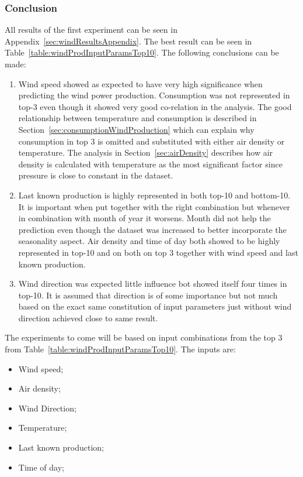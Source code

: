 \subsubsection{Conclusion}
All results of the first experiment can be seen in Appendix~\ref{sec:windResultsAppendix}. The best result can be seen in Table~\ref{table:windProdInputParamsTop10}. The following conclusions can be made: 

\begin{enumerate}
\item Wind speed showed as expected to have very high significance when predicting the wind power production. Consumption was not represented in top-3 even though it showed very good co-relation in the analysis. The good relationship between temperature and consumption is described in Section~\ref{sec:consumptionWindProduction} which can explain why consumption in top 3 is omitted and substituted with either air density or temperature. The analysis in Section~\ref{sec:airDensity} describes how air density is calculated with temperature as the most significant factor since pressure is close to constant in the dataset.   
\item Last known production is highly represented in both top-10 and bottom-10. It is important when put together with the right combination but whenever in combination with month of year it worsens. Month did not help the prediction even though the dataset was increased to better incorporate the seasonality aspect. Air density and time of day both showed to be highly represented in top-10 and on both on top 3 together with wind speed and last known production.
\item Wind direction was expected little influence bot showed itself four times in top-10. It is assumed that direction is of some importance but not much based on the exact same constitution of input parameters just without wind direction achieved close to same result.
\end{enumerate}

The experiments to come will be based on input combinations from the top 3 from Table~\ref{table:windProdInputParamsTop10}. The inputs are:
\begin{itemize}
\item Wind speed;
\item Air density;
\item Wind Direction;
\item Temperature;
\item Last known production;
\item Time of day;
\end{itemize}
\newpage
